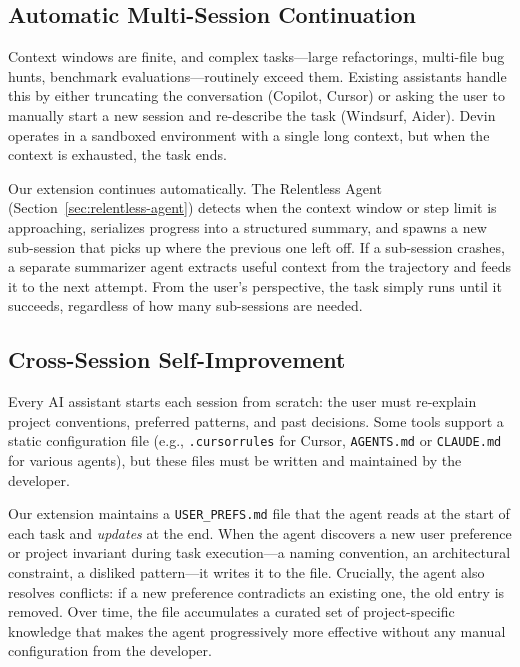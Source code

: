 \documentclass{article}
\begin{document}
\subsection{Automatic Multi-Session Continuation}
\label{sec:continuation-feature}

Context windows are finite, and complex tasks---large refactorings,
multi-file bug hunts, benchmark evaluations---routinely exceed them.
Existing assistants handle this by either truncating the conversation
(Copilot, Cursor) or asking the user to manually start a new session
and re-describe the task (Windsurf, Aider).  Devin operates in a
sandboxed environment with a single long context, but when the context
is exhausted, the task ends.

Our extension continues automatically.  The Relentless Agent
(Section~\ref{sec:relentless-agent}) detects when the context window
or step limit is approaching, serializes progress into a structured
summary, and spawns a new sub-session that picks up where the previous
one left off.  If a sub-session crashes, a separate summarizer agent
extracts useful context from the trajectory and feeds it to the next
attempt.  From the user's perspective, the task simply runs until it
succeeds, regardless of how many sub-sessions are needed.

\subsection{Cross-Session Self-Improvement}
\label{sec:self-improvement-feature}

Every AI assistant starts each session from scratch: the user must
re-explain project conventions, preferred patterns, and past decisions.
Some tools support a static configuration file (e.g.,
\texttt{.cursorrules} for Cursor, \texttt{AGENTS.md} or
\texttt{CLAUDE.md} for various agents), but these files must be
written and maintained by the developer.

Our extension maintains a \texttt{USER\_PREFS.md} file that the agent
reads at the start of each task and \emph{updates} at the end.  When
the agent discovers a new user preference or project invariant during
task execution---a naming convention, an architectural constraint, a
disliked pattern---it writes it to the file.  Crucially, the agent
also resolves conflicts: if a new preference contradicts an existing
one, the old entry is removed.  Over time, the file accumulates a
curated set of project-specific knowledge that makes the agent
progressively more effective without any manual configuration from the
developer.
\end{document}
